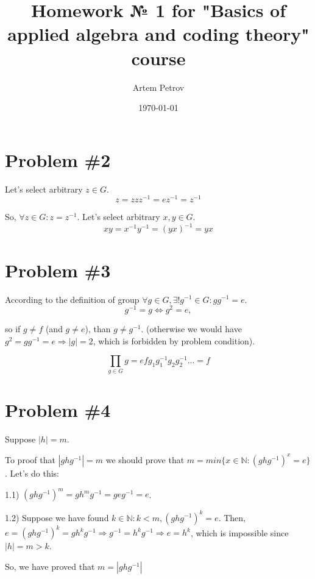 \documentclass[a4paper,12pt]{article}
\author{Artem Petrov}
\title{Homework № 1 for "Basics of applied algebra and coding theory" course}
\date{{\selectlanguage{english}\today} }
\begin{document}

\maketitle

\section*{Problem \#2}

\vartriangle

Let's select arbitrary $ z \in G$.
\[ z = z z z^{-1} = e z^{-1} = z^{-1}\]

So, $ \forall z \in G: z = z^{-1} $.
Let's select arbitrary $ x, y \in G$.
\[ xy = x^{-1}y^{-1} = (yx)^{-1} = yx \]

\hfill \square

\section*{Problem \#3}

\triangle

According to the definition of group $ \forall g \in G,  \exists! g^{-1} \in G : gg^{-1} = e $.
\[ g^{-1} = g \Leftrightarrow  g^{2} = e, \]

so if $ g\ne f $ (and $ g \ne e $), than $ g \ne g^{-1} $. (otherwise we would have $ g^{2} = gg^{-1} = e \Rightarrow |g| = 2$, which is forbidden by problem condition).

\[ \prod_{g \in G} g = e f g_{1}g_{1}^{-1}g_{2}g_{2}^{-1}... = f\]
\hfill \square

\section*{Problem \#4}

\triangle

Suppose $ |h| = m $.

To proof that $ |ghg^{-1}| = m $ we should prove that $ m = min \{x \in \mathbb{N}: (ghg^{-1})^{x} = e \}$. Let's do this:

1.1) $ (ghg^{-1})^{m} = gh^{m}g^{-1} = geg^{-1} = e$.

1.2) Suppose we have found $ k\in \mathbb{N}: k < m , (ghg^{-1})^{k} = e$. Then, $ e = (ghg^{-1})^{k} = gh^{k}g^{-1} \Rightarrow g^{-1} = h^{k}g^{-1} \Rightarrow e = h^{k} $, which is impossible since $ |h| = m > k $.

So, we have proved that $ m = |ghg^{-1}|$
\end{document}
